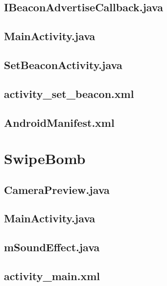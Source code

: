 \documentclass[11pt,a4j]{jarticle}
\begin{document}
\subsection{IBeaconAdvertiseCallback.java}
	
	\newpage
\subsection{MainActivity.java}
	
	\newpage
\subsection{SetBeaconActivity.java}
	
	\newpage


\subsection{activity\_set\_beacon.xml}
	
	\newpage
\subsection{AndroidManifest.xml}
	
	\newpage



\section{SwipeBomb}
\subsection{CameraPreview.java}
	
	\newpage
\subsection{MainActivity.java}
	
	\newpage
\subsection{mSoundEffect.java}
	
	\newpage

\subsection{activity\_main.xml}
	
	\newpage
\end{document}
